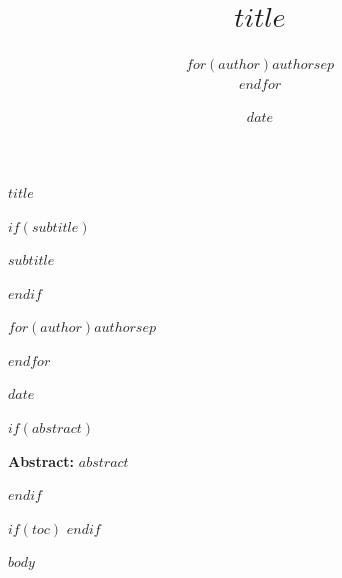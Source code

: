 \documentclass[11pt]{article}
\title{$title$}
\author{$for(author)$$author$$sep$ \\ $endfor$}
\date{$date$}
\renewcommand{\maketitle}{
  \begin{center}
  \vspace*{1cm}
  
  \begin{minipage}{\textwidth}
  \centering
  \fontsize{20}{26}\selectfont\textbf{$title$}
  \end{minipage}
  
  \vspace{0.4cm}
  
  $if(subtitle)$
  \begin{minipage}{\textwidth}
  \centering
  \fontsize{13}{16}\selectfont\itshape $subtitle$
  \end{minipage}
  $endif$
  
  \vspace{0.6cm}
  
  \begin{minipage}{\textwidth}
  \centering
  \Large
  $for(author)$$author$$sep$ \par $endfor$
  \end{minipage}
  
  \vspace{0.6cm}
  
  \Large $date$
  
  \end{center}
  \vspace{1cm}
}
\begin{document}
\maketitle
\thispagestyle{firstpage}

$if(abstract)$
\begin{center}
\begin{minipage}{0.85\textwidth}
\noindent \textbf{Abstract:} $abstract$
\end{minipage}
\end{center}
\vspace{1cm}
$endif$

$if(toc)$
\tableofcontents
\clearpage
$endif$

\pagestyle{fancy}

$body$
\end{document}
